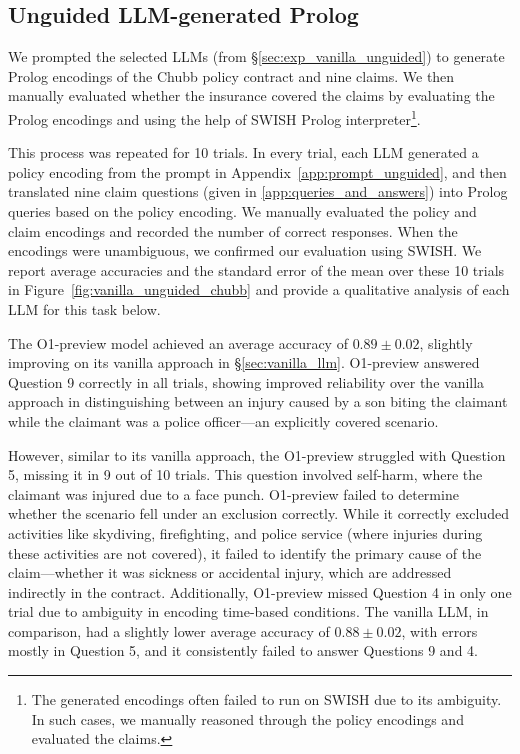 \subsection{Unguided LLM-generated Prolog}
\label{sec:exp_unguided}
We prompted the selected LLMs (from \S\ref{sec:exp_vanilla_unguided}) to generate Prolog encodings of the Chubb policy contract and nine claims. We then manually evaluated whether the insurance covered the claims by evaluating the Prolog encodings and using the help of SWISH Prolog interpreter\footnote{The generated encodings often failed to run on SWISH due to its ambiguity. In such cases, we manually reasoned through the policy encodings and evaluated the claims.}. 

This process was repeated for 10 trials. In every trial, each LLM generated a policy encoding from the prompt in Appendix~\ref{app:prompt_unguided}, and then translated nine claim questions (given in \ref{app:queries_and_answers}) into Prolog queries based on the policy encoding. We manually evaluated the policy and claim encodings and recorded the number of correct responses. When the encodings were unambiguous, we confirmed our evaluation using SWISH.
We report average accuracies and the standard error of the mean over these 10 trials in Figure~\ref{fig:vanilla_unguided_chubb} and provide a qualitative analysis of each LLM for this task below.

The O1-preview model achieved an average accuracy of $0.89 \pm 0.02$, slightly improving on its vanilla approach in \S\ref{sec:vanilla_llm}. O1-preview answered Question 9 correctly in all trials, showing improved reliability over the vanilla approach in distinguishing between an injury caused by a son biting the claimant while the claimant was a police officer—an explicitly covered scenario. 

However, similar to its vanilla approach, the O1-preview struggled with Question 5, missing it in 9 out of 10 trials. This question involved self-harm, where the claimant was injured due to a face punch. O1-preview failed to determine whether the scenario fell under an exclusion correctly. While it correctly excluded activities like skydiving, firefighting, and police service (where injuries during these activities are not covered), it failed to identify the primary cause of the claim—whether it was sickness or accidental injury, which are addressed indirectly in the contract. Additionally, O1-preview missed Question 4 in only one trial due to ambiguity in encoding time-based conditions. The vanilla LLM, in comparison, had a slightly lower average accuracy of $0.88 \pm 0.02$, with errors mostly in Question 5, and it consistently failed to answer Questions 9 and 4. 

